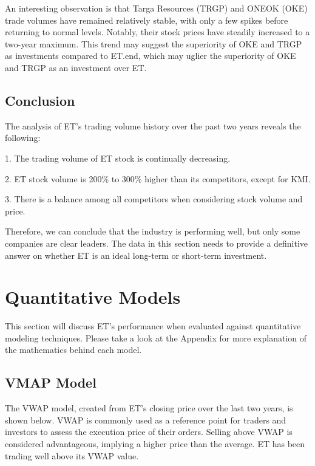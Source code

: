 \documentclass[9pt,a4paper,twoside]{tau}
\begin{document}
    An interesting observation is that Targa Resources (TRGP) and ONEOK (OKE) trade volumes have remained relatively stable, with only a few spikes before returning to normal levels. Notably, their stock prices have steadily increased to a two-year maximum. This trend may suggest the superiority of OKE and TRGP as investments compared to ET.end, which may uglier the superiority of OKE and TRGP as an investment over ET. 

    \subsection{Conclusion}

        The analysis of ET's trading volume history over the past two years reveals the following: 
        
        1. The trading volume of ET stock is continually decreasing.

        2. ET stock volume is 200\% to 300\% higher than its competitors, except for KMI.
        
        3. There is a balance among all competitors when considering stock volume and price.
        
        Therefore, we can conclude that the industry is performing well, but only some companies are clear leaders. The data in this section needs to provide a definitive answer on whether ET is an ideal long-term or short-term investment. 
        


\section{Quantitative Models}

    This section will discuss ET's performance when evaluated against quantitative modeling techniques. Please take a look at the Appendix for more explanation of the mathematics behind each model.

    \subsection{VMAP Model}
    
        The VWAP model, created from ET's closing price over the last two years, is shown below. VWAP is commonly used as a reference point for traders and investors to assess the execution price of their orders. Selling above VWAP is considered advantageous, implying a higher price than the average. ET has been trading well above its VWAP value.
\end{document}

